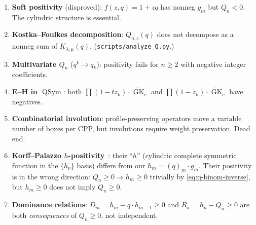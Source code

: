 \documentclass[11pt]{article}
\theoremstyle{plain}
\theoremstyle{definition}
\theoremstyle{remark}
\newcommand{\GK}{\operatorname{GK}}
\newcommand{\QSym}{\operatorname{QSym}}
\begin{document}
\begin{enumerate}
\item \textbf{Soft positivity} (disproved):
  $f(z,q) = 1 + zq$ has nonneg $g_m$ but $Q_n < 0$.
  The cylindric structure is essential.

\item \textbf{Kostka--Foulkes decomposition}:
  $Q_{n,c}(q)$ does not decompose as a nonneg sum of
  $K_{\lambda,\mu}(q)$.
  (\texttt{scripts/analyze\_Q.py}.)

\item \textbf{Multivariate $Q_n$} ($q^k \to q_k$):
  positivity fails for $n \geq 2$ with negative integer
  coefficients.

\item \textbf{E--H in $\QSym$}:
  both $\prod(1-tz_k) \cdot \widetilde{\GK}_c$ and
  $\prod(1-z_k) \cdot \widetilde{\GK}_c$ have negatives.

\item \textbf{Combinatorial involution}:
  profile-preserving operators move a variable number of boxes
  per CPP, but involutions require weight preservation. Dead end.

\item \textbf{Korff--Palazzo $h$-positivity}~\cite{korff-palazzo}:
  their ``$h$'' (cylindric complete symmetric function in the
  $\{h_\nu\}$ basis) differs from our $h_m = (q)_m \cdot g_m$.
  Their positivity is in the wrong direction:
  $Q_n \geq 0 \Rightarrow h_m \geq 0$ trivially by
  \eqref{eq:q-binom-inverse}, but $h_m \geq 0$ does not
  imply $Q_n \geq 0$.

\item \textbf{Dominance relations}:
  $D_m = h_m - q \cdot h_{m-1} \geq 0$ and
  $R_n = h_n - Q_n \geq 0$ are both \emph{consequences}
  of $Q_n \geq 0$, not independent.


\end{enumerate}
\end{document}
